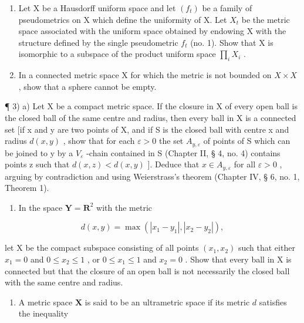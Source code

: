 \ExerciseSection

\begin{enumerate}
\def\labelenumi{\arabic{enumi})}
\item
  Let X be a Hausdorff uniform space and let \((f_{t})\) be a family of pseudometrics on X which define the uniformity of X. Let \(X_{t}\) be the metric space associated with the uniform space obtained by endowing X with the structure defined by the single pseudometric \(f_{t}\) (no. 1). Show that X is isomorphic to a subspace of the product uniform space \(\prod_{i} X_{i}\) .
\item
  In a connected metric space X for which the metric is not bounded on \(X \times X\) , show that a sphere cannot be empty.
\end{enumerate}

¶ 3) a) Let X be a compact metric space. If the closure in X of every open ball is the closed ball of the same centre and radius, then every ball in X is a connected set {[}if x and y are two points of X, and if S is the closed ball with centre x and radius \(d(x, y)\) , show that for each \(\varepsilon > 0\) the set \(A_{y,\varepsilon}\) of points of S which can be joined to y by a \(V_{\varepsilon}\) -chain contained in S (Chapter II, § 4, no. 4) contains points z such that \(d(x, z) < d(x, y)\) {]}. Deduce that \(x \in A_{y,\varepsilon}\) for all \(\varepsilon > 0\) , arguing by contradiction and using Weierstrass's theorem (Chapter IV, § 6, no. 1, Theorem 1).

\begin{enumerate}
\def\labelenumi{\alph{enumi})}
\setcounter{enumi}{1}
\tightlist
\item
  In the space \(\mathbf{Y} = \mathbf{R}^2\) with the metric
\end{enumerate}

\[
d (x, y) = \max \left(\left| x _ {1} - y _ {1} \right|, \left| x _ {2} - y _ {2} \right|\right),
\]

let X be the compact subspace consisting of all points \((x_{1}, x_{2})\) such that either \(x_{1} = 0\) and \(0 \leqslant x_{2} \leqslant 1\) , or \(0 \leqslant x_{1} \leqslant 1\) and \(x_{2} = 0\) . Show that every ball in X is connected but that the closure of an open ball is not necessarily the closed ball with the same centre and radius.

\begin{enumerate}
\def\labelenumi{\arabic{enumi})}
\setcounter{enumi}{3}
\tightlist
\item
  A metric space \(\mathbf{X}\) is said to be an ultrametric space if its metric \(d\) satisfies the inequality
\end{enumerate}

